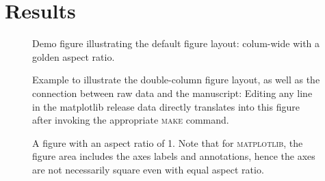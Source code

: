 
\section{Results}%
\label{sec:results}%
\lipsum[3-5]

\begin{figure}[t]
  
  \caption{Demo figure illustrating the default figure layout:
  colum-wide with a golden aspect ratio.}
  \label{fig:hlines_demo}
\end{figure}
\lipsum[3-8]

\begin{figure*}[t]
  
  \caption{Example to illustrate the double-column figure layout, as
  well as the connection between raw data and the manuscript: Editing
  any line in the matplotlib release data directly translates into
  this figure after invoking the appropriate \textsc{make} command.}
  \label{fig:matplotlib_release_dates}
\end{figure*}

\lipsum[1-10]

\begin{figure}[t]
  
  \caption{A figure with an aspect ratio of 1. Note that for
  \textsc{matplotlib}, the figure area includes the axes labels and
  annotations, hence the axes are not necessarily square even with
  equal aspect ratio.}
  \label{fig:solution_space}
\end{figure}

